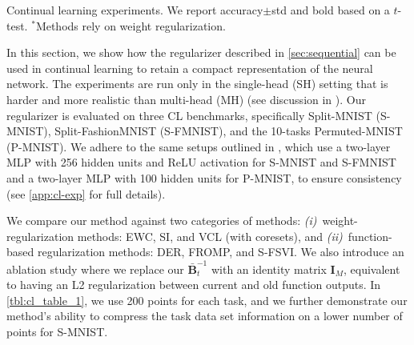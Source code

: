 \documentclass{article}
\newlength{\tblw}
\newcommand{\mbf}[1]{\mathbf{#1}}
\newcommand{\MB}{\mbf{B}}
\newcommand{\MI}{\mbf{I}}
\begin{document}
\setlength{\columnsep}{8pt}
\setlength{\intextsep}{0pt}
\begin{wraptable}{R}{.65\textwidth}
  \centering\scriptsize
  \caption{Continual learning experiments. We report accuracy${\pm}$std and bold based on a $t$-test. $^*$Methods rely on weight regularization.}
	\label{tbl:cl_table_1}
	
	\renewcommand{\arraystretch}{1.}
	\setlength{\tabcolsep}{1pt}
	\setlength{\tblw}{0.14\textwidth}  
	
	\newcommand{\val}[2]{%
		$#1$\textcolor{gray}{\tiny ${\pm}#2$}
	} 
	
	\vspace*{-4pt}
	
	
\end{wraptable}
%
In this section, we show how the regularizer described in \cref{sec:sequential} can be used in continual learning to retain a compact representation of the neural network.
The experiments are run only in the single-head (SH) setting that is harder and more realistic than multi-head (MH) (see discussion in \citep{van2019three}).	
 Our regularizer is evaluated on three CL benchmarks, specifically Split-MNIST (S-MNIST), Split-FashionMNIST (S-FMNIST), and the 10-tasks Permuted-MNIST (P-MNIST). We adhere to the same setups outlined in \cite{rudner2022continual, pan2020continual}, which use a two-layer MLP with 256 hidden units and ReLU activation for S-MNIST and S-FMNIST and a two-layer MLP with 100 hidden units for P-MNIST, to ensure consistency (see \cref{app:cl-exp} for full details).

We compare our method against two categories of methods: {\em (i)}~weight-regularization methods: EWC, SI, and VCL (with coresets), and {\em(ii)}~function-based regularization methods: DER, FROMP, and S-FSVI. We also introduce an ablation study where we replace our $\bar{\MB}_t^{-1}$ with an identity matrix $\MI_M$, equivalent to having an L2 regularization between current and old function outputs.
In \cref{tbl:cl_table_1}, we use 200 points for each task, and we further demonstrate our method's ability to compress the task data set information on a lower number of points for S-MNIST.
\end{document}

